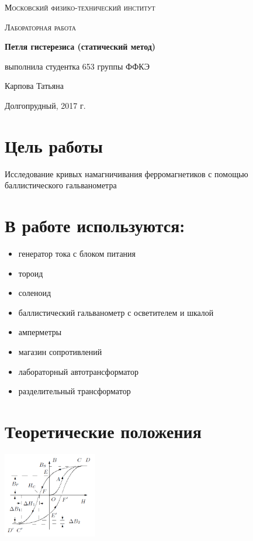 \documentclass[a4paper]{article}
\begin{document}
\begin{titlepage}
	\centering
	\vspace{5cm}
	{\scshape\LARGE Московский физико-технический институт \par}
	\vspace{4cm}
	{\scshape\Large Лабораторная работа \par}
	\vspace{1cm}
	{\huge\bfseries Петля гистерезиса (статический метод) \par}
	\vspace{1cm}
	\vfill
\begin{flushright}
	{\large выполнила студентка 653 группы ФФКЭ}\par
	\vspace{0.3cm}
	{\LARGE Карпова Татьяна}
\end{flushright}
	

	\vfill

	Долгопрудный, 2017 г.
\end{titlepage}

\section{Цель работы}
Исследование кривых намагничивания ферромагнетиков с помощью баллистического гальванометра

\section{В работе используются:}
\begin{itemize}
    \item генератор тока с блоком питания
    \item тороид
    \item соленоид
    \item баллистический гальванометр с осветителем и шкалой
    \item амперметры
    \item магазин сопротивлений
    \item лабораторный автотрансформатор
    \item разделительный трансформатор
\end{itemize}

\section{Теоретические положения}

\begin{floatingfigure}{41mm}
\noindent
\hfil
\includegraphics[width=41mm]{fig1.PNG}
\hfil
\caption{Петля гистерезиса ферромагнетика}
\label{figCurvesFF}
\end{floatingfigure}
\end{document}
